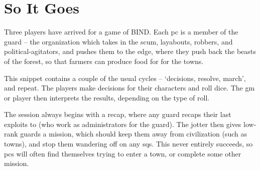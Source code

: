 \section[Example of Play]{So It Goes}

\begin{multicols}{2}

\noindent
Three players have arrived for a game of BIND.
Each \gls{pc} is a member of the \gls{guard} -- the organization which takes in the scum, layabouts, robbers, and political-agitators, and pushes them to the \gls{edge}, where they push back the beasts of the forest, so that farmers can produce food for for the towns.

This snippet contains a couple of the usual cycles -- `decisions, resolve, march', and repeat.
The players make decisions for their characters and roll dice.
The \gls{gm} or player then interprets the results, depending on the type of roll.

The session always begins with a recap, where any \gls{guard} recaps their last exploits to  (who work as administrators for the \gls{guard}).
The \gls{jotter} then gives low-rank \glspl{guard} a mission, which should keep them away from civilization (such as towns), and stop them wandering off on any \glspl{sq}.
This never entirely succeeds, so \glspl{pc} will often find themselves trying to enter a town, or complete some other mission.

\end{multicols}
